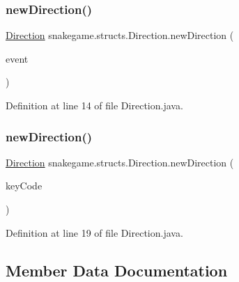 \subsubsection{\texorpdfstring{new\+Direction()}{newDirection()}\hspace{0.1cm}{\footnotesize\ttfamily [1/2]}}
{\footnotesize\ttfamily \mbox{\hyperlink{enumsnakegame_1_1structs_1_1_direction}{Direction}} snakegame.\+structs.\+Direction.\+new\+Direction (\begin{DoxyParamCaption}\item[{Key\+Event}]{event }\end{DoxyParamCaption})}



Definition at line 14 of file Direction.\+java.

\mbox{\label{enumsnakegame_1_1structs_1_1_direction_acca4af48b36042d85f1a9eab2becbf2a}} 
\subsubsection{\texorpdfstring{new\+Direction()}{newDirection()}\hspace{0.1cm}{\footnotesize\ttfamily [2/2]}}
{\footnotesize\ttfamily \mbox{\hyperlink{enumsnakegame_1_1structs_1_1_direction}{Direction}} snakegame.\+structs.\+Direction.\+new\+Direction (\begin{DoxyParamCaption}\item[{int}]{key\+Code }\end{DoxyParamCaption})}



Definition at line 19 of file Direction.\+java.



\subsection{Member Data Documentation}
\mbox{\label{enumsnakegame_1_1structs_1_1_direction_ac1c479971b6ea1b25efe9d3eb82d1e46}} 
